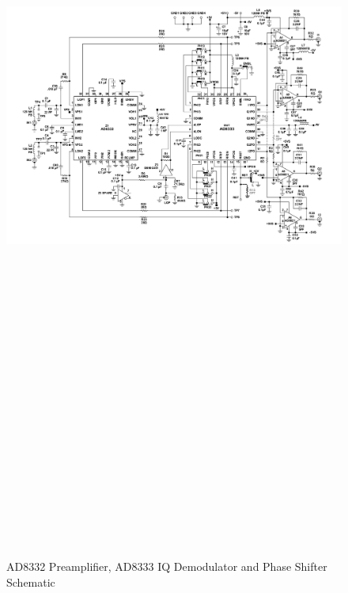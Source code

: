 \begin{landscape}
	\begin{figure}[htbp]
		\centering
		\includegraphics[width=20cm,height=28.7cm,keepaspectratio]{Figures/appendix/ad8333evalz.pdf}
		\caption{AD8332 Preamplifier, AD8333 IQ Demodulator and Phase Shifter Schematic}
		\label{fig:appendix_ad8333}
	\end{figure}
\end{landscape}
